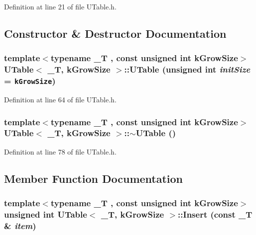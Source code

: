 Definition at line 21 of file UTable.h.

\subsection{Constructor \& Destructor Documentation}
\hypertarget{class_u_table_fdf86bd1f8e6acda65bb45e44bfb29fa}{
\subsubsection[{UTable}]{\setlength{\rightskip}{0pt plus 5cm}template$<$typename \_\-T , const unsigned int kGrowSize$>$ {\bf UTable}$<$ \_\-T, kGrowSize $>$::{\bf UTable} (unsigned int {\em initSize} = {\tt kGrowSize})}}
\label{class_u_table_fdf86bd1f8e6acda65bb45e44bfb29fa}




Definition at line 64 of file UTable.h.\hypertarget{class_u_table_4b646a71fc7c8a361bd619aa94868f40}{
\subsubsection[{$\sim$UTable}]{\setlength{\rightskip}{0pt plus 5cm}template$<$typename \_\-T , const unsigned int kGrowSize$>$ {\bf UTable}$<$ \_\-T, kGrowSize $>$::$\sim${\bf UTable} ()}}
\label{class_u_table_4b646a71fc7c8a361bd619aa94868f40}




Definition at line 78 of file UTable.h.

\subsection{Member Function Documentation}
\hypertarget{class_u_table_b9e88bfef77b8b93b2fed9f321b1825a}{
\subsubsection[{Insert}]{\setlength{\rightskip}{0pt plus 5cm}template$<$typename \_\-T , const unsigned int kGrowSize$>$ unsigned int {\bf UTable}$<$ \_\-T, kGrowSize $>$::Insert (const \_\-T \& {\em item})}}
\label{class_u_table_b9e88bfef77b8b93b2fed9f321b1825a}




